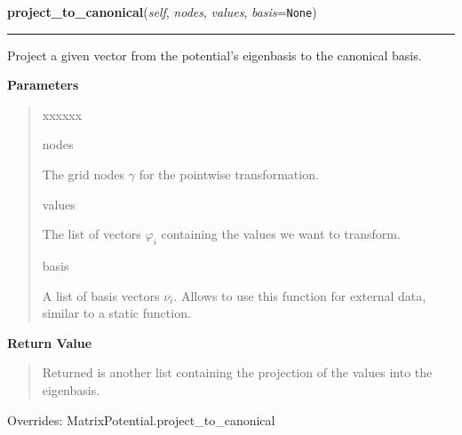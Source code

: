     \vspace{0.5ex}

\hspace{.8\funcindent}\begin{boxedminipage}{\funcwidth}

    \raggedright \textbf{project\_to\_canonical}(\textit{self}, \textit{nodes}, \textit{values}, \textit{basis}={\tt None})

    \vspace{-1.5ex}

    \rule{\textwidth}{0.5\fboxrule}
\setlength{\parskip}{2ex}
    Project a given vector from the potential's eigenbasis to the canonical
    basis.

\setlength{\parskip}{1ex}
      \textbf{Parameters}
      \vspace{-1ex}

      \begin{quote}
        \begin{Ventry}{xxxxxx}

          \item[nodes]

          The grid nodes $\gamma$ for the pointwise
          transformation.

          \item[values]

          The list of vectors $\varphi_i$ containing the values we want
          to transform.

          \item[basis]

          A list of basis vectors $\nu_i$. Allows to use this function
          for external data, similar to a static function.

        \end{Ventry}

      \end{quote}

      \textbf{Return Value}
    \vspace{-1ex}

      \begin{quote}
      Returned is another list containing the projection of the values into
      the eigenbasis.

      \end{quote}



      Overrides: MatrixPotential.project\_to\_canonical

    \end{boxedminipage}

